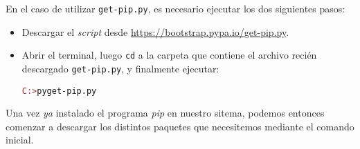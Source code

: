 \documentclass{article}
\begin{document}
\begin{enumerate}
  \par \hspace{5pt} En el caso de utilizar \verb|get-pip.py|, es necesario ejecutar los dos siguientes pasos:
  \begin{itemize}
  \item Descargar el \emph{script} desde \href{https://bootstrap.pypa.io/get-pip.py}{https://bootstrap.pypa.io/get-pip.py}.
  \item Abrir el terminal, luego \verb|cd| a la carpeta que contiene el archivo recién descargado \verb|get-pip.py|, y finalmente ejecutar:
    \begin{tcolorbox}
      \begin{alltt}
        \textcolor{brown}{C:>} py get-pip.py
      \end{alltt}        
    \end{tcolorbox}
  \end{itemize}

  \par \hspace{5pt} Una vez \emph{ya} instalado el programa \emph{pip} en nuestro sitema, podemos entonces comenzar a descargar los distintos paquetes que necesitemos mediante el comando inicial.

\end{enumerate}
\end{document}
